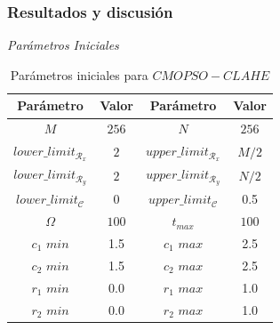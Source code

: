\documentclass[usenames,dvipsnames]{beamer}
\begin{document}
\begin{frame}
\frametitle{Resultados y discusión} 
\begin{exampleblock}{\textit{Parámetros Iniciales }}

\end{exampleblock}

\begin{table}[H]
\setlength{\abovecaptionskip}{2pt plus 3pt minus 2pt} %
\caption[Parámetros de entrada para $MOPSO$]{Parámetros iniciales para $CMOPSO-CLAHE$}
\begin{center}
\begin{tabular}{||c c | c c||} 
\hline
Parámetro & Valor & Parámetro & Valor \\ [0.5ex] 
\hline\hline
$M$ & $256$ & $N$ & $256$ \\ 
\hline
$lower\_limit_{\mathscr{R}_x}$ & $2$ & $upper\_limit_{\mathscr{R}_x}$ & $M/2$ \\ 
\hline
$lower\_limit_{\mathscr{R}_y}$ & $2$ & $upper\_limit_{\mathscr{R}_y}$ & $N/2$ \\  
\hline
$lower\_limit_{{\mathscr{C}}}$ & $0$ & $upper\_limit_{{\mathscr{C}}}$ & 0.5 \\
\hline
$\Omega$ & $100$ & $t_{max}$ & $100$ \\ 
\hline
$c_1$ $min$ & 1.5 & $c_1$ $max$ & 2.5 \\ 
\hline
$c_2$ $min$ & 1.5 & $c_2$ $max$ & 2.5 \\ 
\hline
$r_1$ $min$ & 0.0 & $r_1$ $max$ & 1.0 \\ 
\hline
$r_2$ $min$ & 0.0 & $r_2$ $max$ & 1.0 \\
\hline
\end{tabular}
\end{center}
\label{table:parametrospso}
\end{table}

\end{frame}
\end{document}
